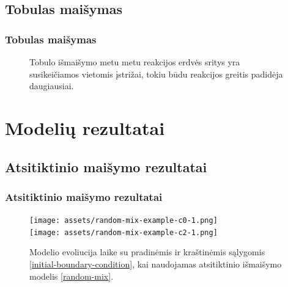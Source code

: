 \documentclass{beamer}
\begin{document}
\subsection{Tobulas maišymas}
\begin{frame}
\frametitle{Tobulas maišymas}
\begin{figure}
\centering
{}
\caption{Tobulo išmaišymo metu metu reakcijos erdvės sritys yra susikeičiamos vietomis įstrižai, tokiu būdu reakcijos greitis padidėja daugiausiai. }
\label{perfect-mix}
\end{figure}
\end{frame}

\section{Modelių rezultatai}

\subsection{Atsitiktinio maišymo rezultatai}
\begin{frame}
    \frametitle{Atsitiktinio maišymo rezultatai}
    \begin{figure}
        \centering
        \texttt{[image: assets/random-mix-example-c0-1.png]} \\
        \texttt{[image: assets/random-mix-example-c2-1.png]}
        \caption{Modelio evoliucija laike su pradinėmis ir kraštinėmis sąlygomis \eqref{initial-boundary-condition}, kai naudojamas atsitiktinio išmaišymo modelis \eqref{random-mix}.}
    \end{figure}
\end{frame}
\end{document}
